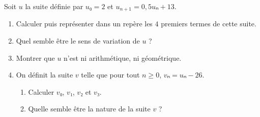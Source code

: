 \documentclass[
	classe=$1^{ere}STI2D$
]{évaluation}
\begin{document}
\begin{exercice}[7]
	Soit $u$ la suite définie par $u₀ = 2$ et $u_{n+1} = 0,5uₙ + 13$.

	\begin{enumerate}
		\item Calculer puis représenter dans un repère les $4$ premiers termes de cette suite.

		\item Quel semble être le sens de variation de $u$ ?

		\item Montrer que $u$ n'est ni arithmétique, ni géométrique.
		\item On définit la suite $v$ telle que pour tout $n ≥ 0$, $vₙ = uₙ - 26$.
		      \begin{enumerate}
			      \item Calculer $v₀$, $v₁$, $v₂$ et $v₃$.

			      \item Quelle semble être la nature de la suite $v$ ?


\end{enumerate}
\end{enumerate}
\end{exercice}
\end{document}
